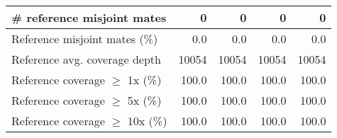 \documentclass[12pt,a4paper]{article}
\begin{document}
\begin{table}[ht]
\begin{center}
\begin{tabular}{|l*{4}{|r}|}
\# reference misjoint mates & 0 & 0 & 0 & 0 \\ \hline
Reference misjoint mates (\%) & 0.0 & 0.0 & 0.0 & 0.0 \\ \hline
Reference avg. coverage depth & 10054 & 10054 & 10054 & 10054 \\ \hline
Reference coverage $\geq$ 1x (\%) & 100.0 & 100.0 & 100.0 & 100.0 \\ \hline
Reference coverage $\geq$ 5x (\%) & 100.0 & 100.0 & 100.0 & 100.0 \\ \hline
Reference coverage $\geq$ 10x (\%) & 100.0 & 100.0 & 100.0 & 100.0 \\ \hline
\end{tabular}
\end{center}
\end{table}
\end{document}
